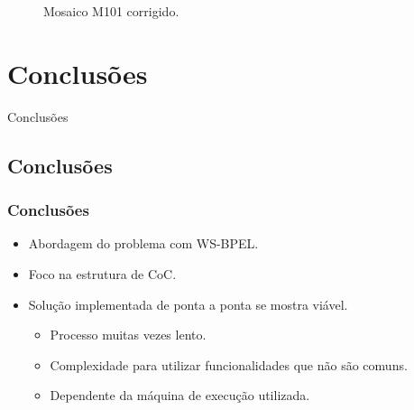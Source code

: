 \documentclass[red, cover=invisible, theme=Warsaw]{myslides}
\begin{document}
\begin{frame}
\begin{center}
\begin{figure}[!htb]
\begin{minipage}[b]{0.45\linewidth}
			\caption{Mosaico M101 corrigido.}
			\label{fig:MosaicoCorrigido}
		    \end{minipage}
		\end{figure}
	    \end{center}
	\end{frame}
    
\section{Conclusões}
    \begin{frame}
	\begin{center}
	{\Huge Conclusões}
	\end{center}
    \end{frame}
    
    \subsection*{Conclusões}
    \begin{frame} \frametitle{Conclusões}
	\begin{itemize}
	    \item Abordagem do problema com WS-BPEL.
	    \item Foco na estrutura de CoC.
	    \item Solução implementada de ponta a ponta se mostra viável.
		\begin{itemize}
		    \item Processo muitas vezes lento.
		    \item Complexidade para utilizar funcionalidades que não são comuns.
		    \item Dependente da máquina de execução utilizada.
		\end{itemize}
	\end{itemize}
    \end{frame}
    
\end{document}
